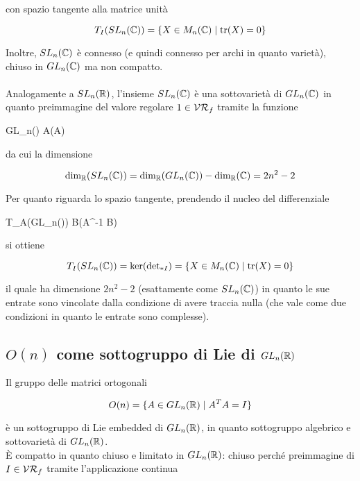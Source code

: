 con spazio tangente alla matrice unità

\begin{equation}
	T_{I}(SL_{n}(\mathbb{C})) = \{ X \in M_{n}(\mathbb{C}) \mid \tr(X) = 0 \}
\end{equation}

Inoltre, $ SL_{n}(\mathbb{C}) $ è connesso (e quindi connesso per archi in quanto varietà), chiuso in $ GL_{n}(\mathbb{C}) $ ma non compatto.\\\\
%
Analogamente a $ SL_{n}(\mathbb{R}) $, l'insieme $ SL_{n}(\mathbb{C}) $ è una sottovarietà di $ GL_{n}(\mathbb{C}) $ in quanto preimmagine del valore regolare $ 1 \in \mathcal{VR}_{f} $ tramite la funzione

	{GL_{n}(\C)}{\C}
	{A}{\det(A)}

da cui la dimensione

\begin{equation}
	\dim_{\mathbb{R}}(SL_{n}(\mathbb{C})) = \dim_{\mathbb{R}}(GL_{n}(\mathbb{C})) - \dim_{\mathbb{R}}(\mathbb{C}) = 2 n^{2} - 2
\end{equation}

Per quanto riguarda lo spazio tangente, prendendo il nucleo del differenziale

	{T_{A}(GL_{n}(\C))}{\C}
	{B}{\tr(A^{-1} B)}

si ottiene

\begin{equation}
	T_{I}(SL_{n}(\mathbb{C})) = \ker(\operatorname{det}_{*I}) = \{ X \in M_{n}(\mathbb{C}) \mid \tr(X) = 0 \}
\end{equation}

il quale ha dimensione $ 2 n^{2} - 2 $ (esattamente come $ SL_{n}(\mathbb{C}) $) in quanto le sue entrate sono vincolate dalla condizione di avere traccia nulla (che vale come due condizioni in quanto le entrate sono complesse).

\subsection{$ O(n) $ come sottogruppo di Lie di $ GL_{n}(\mathbb{R}) $}\label{ssec:o-n-subgroup-lie-glnr}

Il gruppo delle matrici ortogonali

\begin{equation}
	O(n) = \{ A \in GL_{n}(\mathbb{R}) \mid A^{T} A = I \}
\end{equation}

è un sottogruppo di Lie embedded di $ GL_{n}(\mathbb{R}) $, in quanto sottogruppo algebrico e sottovarietà di $ GL_{n}(\mathbb{R}) $.\\
È compatto in quanto chiuso e limitato in $ GL_{n}(\mathbb{R}) $: chiuso perché preimmagine di $ I \in \mathcal{VR}_{f} $ tramite l'applicazione continua

